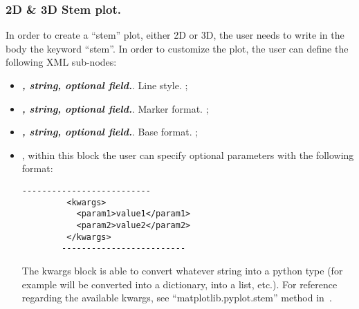 \subsubsection{2D \& 3D Stem plot.}
In order to create a ``stem'' plot, either 2D or 3D, the user needs to write in
the  body the keyword ``stem''.
%
In order to customize the plot, the user can define the following XML sub-nodes:
  \begin{itemize}
  \item {}\textbf{\textit{, string, optional field.}}.
  Line style.
  ;
  \item {}\textbf{\textit{, string, optional field.}}.
  Marker format.
  ;
  \item {}\textbf{\textit{, string, optional field.}}.
  Base format.
  ;
  \item \textit{}, within this block the user can specify optional
  parameters with the following format:
        \begin{lstlisting}[style=XML]
        --------------------------
         <kwargs>
           <param1>value1</param1>
           <param2>value2</param2>
         </kwargs>
        -------------------------
       \end{lstlisting}
  The kwargs block is able to convert whatever string into a python type (for
  example  will be converted into a
  dictionary,  into a list, etc.).
  For reference regarding the available kwargs, see ``matplotlib.pyplot.stem''
  method in~\cite{MatPlotLib}.
    \end{itemize}


